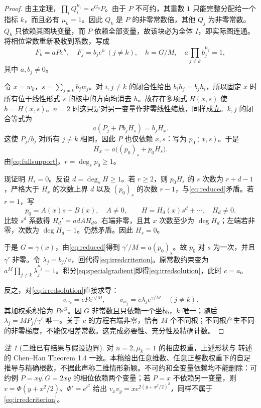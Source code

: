 \documentclass[UTF8,11pt,a4paper,fontset=fandol]{ctexart}
\theoremstyle{definition}\newtheorem{definition}[theorem]{定义}
\theoremstyle{remark}\newtheorem{remark}[theorem]{注}
\begin{document}
\begin{proof}
由主定理，$\prod_iQ_i^{\mu_i}=e^{G_0}P$。由于 $P$ 不可约，其重数 $1$ 只能完整分配给一个指标 $k$，而且必有 $\mu_k=1$。因此 $Q_k$ 是 $P$ 的非零常数倍，其他 $Q_j$ 为非零常数。$Q_k$ 只依赖其图块变量，而 $P$ 依赖全部变量，故该块必为全体 $I$，即实际图连通。将相位常数重新吸收到系数，写成
\begin{equation}\label{eq:specialgradient}
F_k=aPe^h,\quad F_j=b_je^h\ (j\ne k),\quad
h=G/M,\quad a\prod_{j\ne k}b_j^{\mu_j}=1,
\end{equation}
其中 $a,b_j\ne0$。

令 $x=w_k$，$s=\sum_{j\ne k}b_jw_j$。对 $i,j\ne k$ 的闭合性给出 $b_i h_j=b_j h_i$，所以固定 $x$ 时所有位于线性形式 $s$ 的核中的方向均消去 $h$。故存在多项式 $H(x,s)$ 使 $h=H(x,s)$。$n=2$ 时这只是对另一变量作非零线性缩放，同样成立。$k,j$ 的闭合等式为
\[
a(P_j+P b_jH_s)=b_jH_x.
\]
这使 $P_j/b_j$ 对所有 $j\ne k$ 相同，因此 $P$ 也仅依赖 $x,s$：写为 $p_0(x,s)$。于是
\begin{equation}\label{eq:reduced}
H_x=a\bigl((p_0)_s+p_0H_s\bigr).
\end{equation}
由\eqref{eq:fullsupport}，$r=\deg_s p_0\ge1$。

现证明 $H_s=0$。反设 $d=\deg_sH\ge1$。若 $r\ge2$，则 $p_0H_s$ 的 $s$ 次数为 $r+d-1$，严格大于 $H_x$ 的次数上界 $d$ 以及 $(p_0)_s$ 的次数 $r-1$，与\eqref{eq:reduced}矛盾。若 $r=1$，写
\[
p_0=A(x)s+B(x),\quad A\ne0,\qquad H=H_d(x)s^d+\cdots,\quad H_d\ne0.
\]
比较 $s^d$ 系数得 $H_d'=adAH_d$。右端非零，且其 $x$ 次数至少为 $\deg H_d$；左端若非零，次数为 $\deg H_d-1$。仍然矛盾。因此 $H_s=0$。

于是 $G=\gamma(x)$，由\eqref{eq:reduced}得到 $\gamma'/M=a(p_0)_s$。故 $p_0$ 对 $s$ 为一次，并且 $\gamma'$ 非零。令 $\lambda_j=b_j/a$，回代得\eqref{eq:irredcriterion}。原常数约束变为 $a^M\prod_{j\ne k}\lambda_j^{\mu_j}=1$。积分\eqref{eq:specialgradient}即得\eqref{eq:irredsolution}，此时 $c=a$。

反之，对\eqref{eq:irredsolution}直接求导：
\[
v_{w_k}=cPe^{\gamma/M},\qquad v_{w_j}=c\lambda_j e^{\gamma/M}\quad(j\ne k).
\]
其加权乘积恰为 $Pe^G$。因 $G$ 非常数且只依赖一个坐标，$k$ 唯一；随后 $\lambda_j=M P_j/\gamma'$ 唯一。关于 $c$ 的方程右端非零，恰有 $M$ 个不同根；不同根产生不同的非零梯度，不能仅相差常数。这完成必要性、充分性及精确计数。
\end{proof}

\begin{remark}[二维已有结果与假设边界]
对 $n=2,\mu_k=1$ 的相应权重，上述形状与\cite{XuEtAl2023} 转述的 Chen--Han Theorem 1.4 一致。本稿给出任意维数、任意正整数权重下的自足推导与精确根数，不据此声称二维情形新颖。不可约和全变量依赖均不能删除：可约例 $P=xy,G=2xy$ 的相位依赖两个变量；若 $P=x$ 不依赖另一变量，则 $v=\Phi(y+x^2/2)$、$\Phi'=e^{t^2}$ 给出 $v_xv_y=x e^{2(y+x^2/2)^2}$，同样不属于\eqref{eq:irredcriterion}。
\end{remark}
\end{document}
